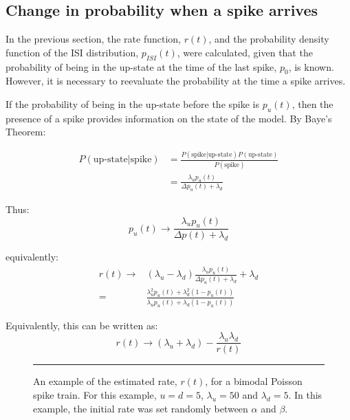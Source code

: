 \subsection{Change in probability when a spike arrives}

In the previous section, the rate function, $r(t)$, and the probability density function of the ISI distribution, $p_{ISI}(t)$, were calculated, given that the probability of being in the up-state at the time of the last spike, $p_0$, is known.  However, it is necessary to reevaluate the probability at the time a spike arrives.

If the probability of being in the up-state before the spike is $p_u(t)$, then the presence of a spike provides information on the state of the model. By Baye's Theorem:

\begin{equation}
\begin{split}
P(\mbox{up-state} | \mbox{spike}) &= \frac{P(\mbox{spike}|\mbox{up-state})P(\mbox{up-state})}{P(\mbox{spike})} \\
&=\frac{\lambda_u p_u(t)}{\Delta p_u(t) + \lambda_d }
\end{split}
\end{equation}

Thus:
\begin{equation}
p_u(t) \rightarrow \frac{\lambda_u p_u(t)}{\Delta p(t) + \lambda_d}
\end{equation}

equivalently:
\begin{equation}
\begin{split}
r(t) \rightarrow &(\lambda_u - \lambda_d)\frac{\lambda_u p_u(t)}{\Delta p_u(t)+ \lambda_d} + \lambda_d\\
= & \frac{\lambda_u^2 p_u(t) + \lambda_d^2(1-p_u(t))}{\lambda_up_u(t) + \lambda_d(1-p_u(t))}
\end{split}
\end{equation}

Equivalently, this can be written as:
\begin{equation}
r(t) \rightarrow (\lambda_u +\lambda_d) - \frac{\lambda_u\lambda_d}{r(t)}
\end{equation}

\begin{figure}[htb]

\bigskip
\rule{35em}{0.5pt}
\caption{An example of the estimated rate, $r(t)$, for a bimodal Poisson spike train.  For this example, $u=d=5$, $\lambda_u=50$ and $\lambda_d=5$.  In this example, the initial rate was set randomly between $\alpha$ and $\beta$.}
\end{figure}

